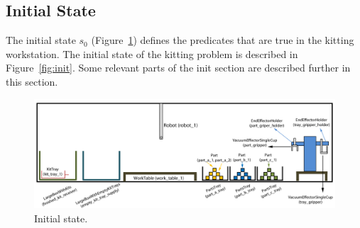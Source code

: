 \subsection{Initial State}
The initial state $s_0$ (Figure~\ref{fig:s0}) defines the predicates that are true in the kitting workstation. The initial state of the kitting problem is described in Figure~\ref{fig:init}. Some relevant parts of the init section are described further in this section.

\begin{figure}[h!b!]
\centering
\includegraphics[width=16cm]{Figure/s0.jpg}
\caption{Initial state.}
\label{fig:s0}
\end{figure}

